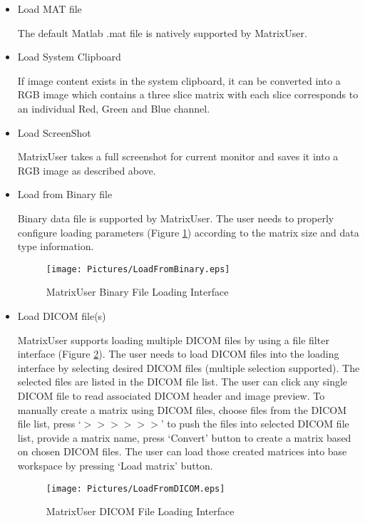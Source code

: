 \documentclass{book}%
\begin{document}
	\begin{itemize}
	
	\item Load MAT file

The default Matlab .mat file is natively supported by MatrixUser.

	\item Load System Clipboard
	
If image content exists in the system clipboard, it can be converted into a RGB image which contains a three slice matrix with each slice corresponds to an individual Red, Green and Blue channel.

  \item Load ScreenShot

MatrixUser takes a full screenshot for current monitor and saves it into a RGB image as described above.
	
	\item Load from Binary file

Binary data file is supported by MatrixUser. The user needs to properly configure loading parameters (Figure \ref{fig:LoadFromBinary}) according to the matrix size and data type information.

\begin{figure}[htbp]
	\centering
		\texttt{[image: Pictures/LoadFromBinary.eps]}
	\caption{MatrixUser Binary File Loading Interface}
	\label{fig:LoadFromBinary}
\end{figure}	

 \item Load DICOM file(s)
		
MatrixUser supports loading multiple DICOM files by using a file filter interface (Figure \ref{fig:LoadFromDICOM}). The user needs to load DICOM files into the loading interface by selecting desired DICOM files (multiple selection supported). The selected files are listed in the DICOM file list. The user can click any single DICOM file to read associated DICOM header and image preview. To manually create a matrix using DICOM files, choose files from the DICOM file list, press `$>>>>>>$' to push the files into selected DICOM file list, provide a matrix name, press `Convert' button to create a matrix based on chosen DICOM files. The user can load those created matrices into base workspace by pressing `Load matrix' button.
		
\begin{figure}[htbp]
	\centering
		\texttt{[image: Pictures/LoadFromDICOM.eps]}
	\caption{MatrixUser DICOM File Loading Interface}
	\label{fig:LoadFromDICOM}
\end{figure}	


\end{itemize}
\end{document}
